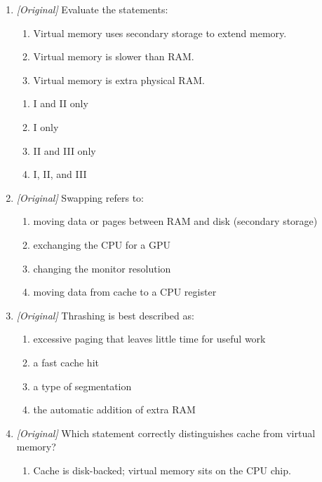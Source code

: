 \documentclass[11pt]{article}
\begin{document}
\begin{enumerate}[label=\textbf{Q\arabic*.}, leftmargin=*]
\begin{enumerate}[label=\Alph*.]
    \item Virtual memory is additional physical RAM.
    \item Virtual memory lets a process use a large contiguous address space.
  \end{enumerate}
\item \textit{[Original]} Evaluate the statements:
  \begin{enumerate}[label=\Roman*.]
    \item Virtual memory uses secondary storage to extend memory.
    \item Virtual memory is slower than RAM.
    \item Virtual memory is extra physical RAM.
  \end{enumerate}
  \begin{enumerate}[label=\Alph*.]
    \item I and II only
    \item I only
    \item II and III only
    \item I, II, and III
  \end{enumerate}
\item \textit{[Original]} Swapping refers to:
  \begin{enumerate}[label=\Alph*.]
    \item moving data or pages between RAM and disk (secondary storage)
    \item exchanging the CPU for a GPU
    \item changing the monitor resolution
    \item moving data from cache to a CPU register
  \end{enumerate}
\item \textit{[Original]} Thrashing is best described as:
  \begin{enumerate}[label=\Alph*.]
    \item excessive paging that leaves little time for useful work
    \item a fast cache hit
    \item a type of segmentation
    \item the automatic addition of extra RAM
  \end{enumerate}
\item \textit{[Original]} Which statement correctly distinguishes cache from
  virtual memory?
  \begin{enumerate}[label=\Alph*.]
    \item Cache is disk-backed; virtual memory sits on the CPU chip.

\end{enumerate}
\end{enumerate}
\end{document}
